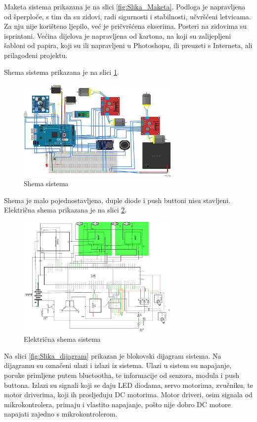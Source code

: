 Maketa sistema prikazana je na slici \ref{fig:Slika_Maketa}. Podloga je napravljena od šperploče, s tim da su zidovi, radi sigurnosti i stabilnosti, učvršćeni letvicama. Za nju nije korišteno ljepilo, već je pričvršćena ekserima. Posteri na zidovima su isprintani. Većina dijelova je napravljena od kartona, na koji su zalijepljeni šabloni od papira, koji su ili napravljeni u Photoshopu, ili preuzeti s Interneta, ali prilagođeni projektu. 

Shema sistema prikazana je na slici \ref{fig:Slika_shema}.
\begin{figure}[h!]
  \centering
  \includegraphics[width=0.7\textwidth]{shema2}
  \caption{Shema sistema}
  \label{fig:Slika_shema}
\end{figure}

Shema je malo pojednostavljena, duple diode i push buttoni nisu stavljeni. Električna shema prikazana je na slici \ref{fig:Slika_elshema}. 

\begin{figure}[h!]
  \centering
  \includegraphics[width=0.7\textwidth]{elshema}
  \caption{Električna shema sistema}
  \label{fig:Slika_elshema}
\end{figure}

Na slici \ref{fig:Slika_dijagram} prikazan je blokovski dijagram sistema. Na dijagramu su označeni ulazi i izlazi iz sistema. Ulazi u sistem su napajanje, poruke primljene putem bluetootha, te informacije od senzora, modula i push buttona. Izlazi su signali koji se daju LED diodama, servo motorima, zvučniku, te motor driverima, koji ih prosljeđuju DC motorima. Motor driveri, osim signala od mikrokontrolera, primaju i vlastito napajanje, pošto nije dobro DC motore napajati zajedno s mikrokontrolerom. 

